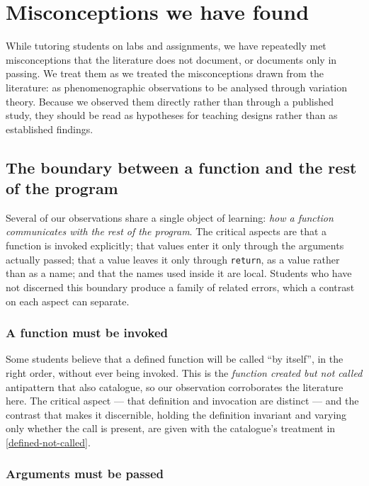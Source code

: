 \mode*
\section{Misconceptions we have found}

While tutoring students on labs and assignments, we have repeatedly met
misconceptions that the literature does not document, or documents only in
passing. We treat them as we treated the misconceptions drawn from the
literature: as phenomenographic observations to be analysed through variation
theory. Because we observed them directly rather than through a published study,
they should be read as hypotheses for teaching designs rather than as
established findings.

\subsection{The boundary between a function and the rest of the program}

Several of our observations share a single object of learning: \emph{how a
function communicates with the rest of the program}. The critical aspects are
that a function is invoked explicitly; that values enter it only through the
arguments actually passed; that a value leaves it only through
\texttt{return}, as a value rather than as a name; and that the
names used inside it are local. Students who have not discerned this boundary
produce a family of related errors, which a contrast on each aspect can separate.

\subsubsection{A function must be invoked}

Some students believe that a defined function will be called \enquote{by itself},
in the right order, without ever being invoked. This is the \emph{function
created but not called} antipattern that \textcite{Bosse2021Antipatterns} also
catalogue, so our observation corroborates the literature here. The critical
aspect --- that definition and invocation are distinct --- and the contrast that
makes it discernible, holding the definition invariant and varying only whether
the call is present, are given with the catalogue's treatment in
\cref{defined-not-called}.

\subsubsection{Arguments must be passed}

